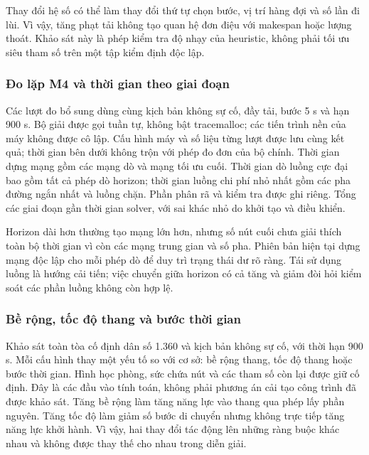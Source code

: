 Thay đổi hệ số có thể làm thay đổi thứ tự chọn bước, vị trí hàng đợi và số lần đi lùi. Vì vậy, tăng phạt tải không tạo quan hệ đơn điệu với makespan hoặc lượng thoát. Khảo sát này là phép kiểm tra độ nhạy của heuristic, không phải tối ưu siêu tham số trên một tập kiểm định độc lập.

\subsubsection{Đo lặp M4 và thời gian theo giai đoạn}
Các lượt đo bổ sung dùng cùng kịch bản không sự cố, đầy tải, bước 5 s và hạn 900 s. Bộ giải được gọi tuần tự, không bật tracemalloc; các tiến trình nền của máy không được cô lập. Cấu hình máy và số liệu từng lượt được lưu cùng kết quả; thời gian bên dưới không trộn với phép đo đơn của bộ chính.
Thời gian dựng mạng gồm các mạng dò và mạng tối ưu cuối. Thời gian dò luồng cực đại bao gồm tất cả phép dò horizon; thời gian luồng chi phí nhỏ nhất gồm các pha đường ngắn nhất và luồng chặn. Phần phân rã và kiểm tra được ghi riêng. Tổng các giai đoạn gần thời gian solver, với sai khác nhỏ do khởi tạo và điều khiển.

Horizon dài hơn thường tạo mạng lớn hơn, nhưng số nút cuối chưa giải thích toàn bộ thời gian vì còn các mạng trung gian và số pha. Phiên bản hiện tại dựng mạng độc lập cho mỗi phép dò để duy trì trạng thái dư rõ ràng. Tái sử dụng luồng là hướng cải tiến; việc chuyển giữa horizon có cả tăng và giảm đòi hỏi kiểm soát các phần luồng không còn hợp lệ.

\subsubsection{Bề rộng, tốc độ thang và bước thời gian}
Khảo sát toàn tòa cố định dân số 1.360 và kịch bản không sự cố, với thời hạn 900 s. Mỗi cấu hình thay một yếu tố so với cơ sở: bề rộng thang, tốc độ thang hoặc bước thời gian. Hình học phòng, sức chứa nút và các tham số còn lại được giữ cố định. Đây là các đầu vào tính toán, không phải phương án cải tạo công trình đã được khảo sát.
Tăng bề rộng làm tăng năng lực vào thang qua phép lấy phần nguyên. Tăng tốc độ làm giảm số bước di chuyển nhưng không trực tiếp tăng năng lực khởi hành. Vì vậy, hai thay đổi tác động lên những ràng buộc khác nhau và không được thay thế cho nhau trong diễn giải.

